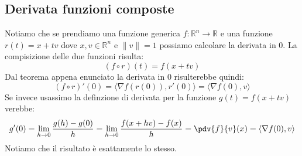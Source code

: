 \subsection{Derivata funzioni composte}
Notiamo che se prendiamo una funzione generica $f: \mathbb{R}^n \to \mathbb{R}$ e una funzione $r(t) = x + tv$ dove $x, v \in \mathbb{R}^n$ e $\lVert v \rVert = 1$ possiamo calcolare la derivata in 0. La compisizione delle due funzioni risulta:
\begin{equation*}
	(f \circ r)(t) = f(x + tv) 
\end{equation*}
Dal teorema appena enunciato la derivata in 0 risulterebbe quindi:
\begin{equation*}
	(f \circ r)'(0) = \langle \nabla f(r(0)), r'(0) \rangle = \langle \nabla f(0), v \rangle 
\end{equation*}
Se invece usassimo la definzione di derivata per la funzione $g(t) = f(x + tv)$ verebbe:
\begin{equation*}
	g'(0) = \lim_{h \to 0} \dfrac{g(h) - g(0)}{h} = \lim_{h \to 0} \dfrac{f(x + hv) - f(x)}{h} = \pdv{f}{v} (x) = \langle \nabla f(0), v \rangle
\end{equation*}
Notiamo che il risultato è esattamente lo stesso.
